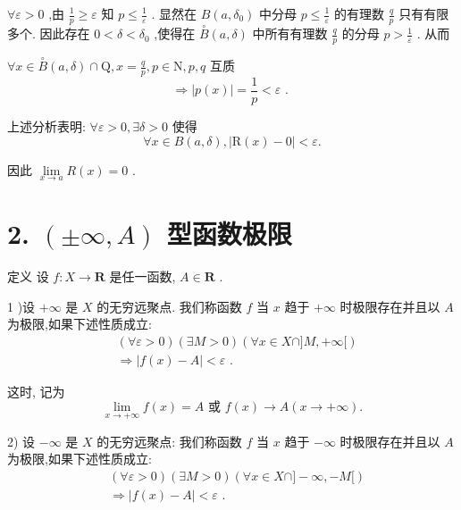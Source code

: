 $\forall \varepsilon  > 0$ ,由 $\frac{1}{p} \geq  \varepsilon$ 知 $p \leq  \frac{1}{\varepsilon }$ . 显然在 $B\left( {a,{\delta }_{0}}\right)$ 中分母 $p \leq  \frac{1}{\varepsilon }$ 的有理数 $\frac{q}{p}$ 只有有限多个. 因此存在 $0 < \delta  < {\delta }_{0}$ ,使得在 $\overset{ \circ  }{B}\left( {a,\delta }\right)$ 中所有有理数 $\frac{q}{p}$ 的分母 $p > \frac{1}{\varepsilon }$ . 从而

$\forall x \in  \overset{ \circ  }{B}\left( {a,\delta }\right)  \cap  \mathrm{Q},x = \frac{q}{p},p \in  \mathrm{N},p,q$ 互质
$$\Rightarrow  \left| {p\left( x\right) }\right|  = \frac{1}{p} < \varepsilon \text{ . }$$

上述分析表明: $\forall \varepsilon  > 0,\exists \delta  > 0$ 使得
$$\forall x \in  B\left( {a,\delta }\right) ,\left| {\mathrm{R}\left( x\right)  - 0}\right|  < \varepsilon .$$

因此 $\mathop{\lim }\limits_{{x \rightarrow  a}}R\left( x\right)  = 0$ .

\section*{2. $\left( {\pm \infty ,A}\right)$ 型函数极限}

定义 设 $f : X \rightarrow  \mathbf{R}$ 是任一函数, $A \in  \mathbf{R}$ .

1 )设 $+ \infty$ 是 $X$ 的无穷远聚点. 我们称函数 $f$ 当 $x$ 趋于 $+ \infty$ 时极限存在并且以 $A$ 为极限,如果下述性质成立:
\begin{align*}
	&\left( {\forall \varepsilon  > 0}\right) \left( {\exists M > 0}\right) \left( {\forall x \in  X \cap  \rbrack M, + \infty \lbrack }\right)\\
	&\Rightarrow  \left| {f\left( x\right)  - A}\right|  < \varepsilon \text{ . }
\end{align*}

这时, 记为
$$\mathop{\lim }\limits_{{x \rightarrow   + \infty }}f\left( x\right)  = A\text{ 或 }f\left( x\right)  \rightarrow  A\left( {x \rightarrow   + \infty }\right) .$$

2) 设 $- \infty$ 是 $X$ 的无穷远聚点: 我们称函数 $f$ 当 $x$ 趋于 $- \infty$ 时极限存在并且以 $A$ 为极限,如果下述性质成立:
\begin{align*}
	&\left( {\forall \varepsilon  > 0}\right) \left( {\exists M > 0}\right) \left( {\forall x \in  X \cap  \rbrack  - \infty , - M\lbrack }\right)\\
	&\Rightarrow  \left| {f\left( x\right)  - A}\right|  < \varepsilon \text{ . }
\end{align*}

